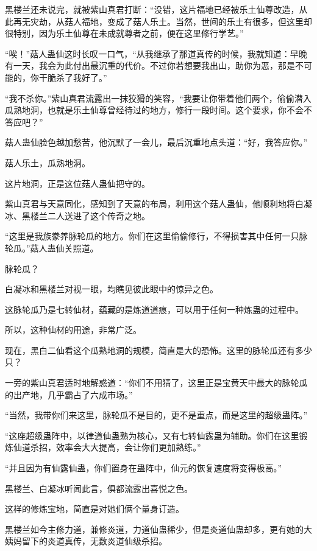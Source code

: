 
\begin{this_body}

黑楼兰还未说完，就被紫山真君打断：“没错，这片福地已经被乐土仙尊改造，从此再无灾劫，从菇人福地，变成了菇人乐土。当然，世间的乐土有很多，但这里却很特别，因为乐土仙尊在未成就尊者之前，便在这里修行学艺。”

“唉！”菇人蛊仙这时长叹一口气，“从我继承了那道真传的时候，我就知道：早晚有一天，我会为此付出最沉重的代价。不过你若想要我出山，助你为恶，那是不可能的，你干脆杀了我好了。”

“我不杀你。”紫山真君流露出一抹狡猾的笑容，“我要让你带着他们两个，偷偷潜入瓜熟地洞，也就是乐土仙尊曾经待过的地方，修行一段时间。这个要求，你不会不答应吧？”

菇人蛊仙脸色越加愁苦，他沉默了一会儿，最后沉重地点头道：“好，我答应你。”

菇人乐土，瓜熟地洞。

这片地洞，正是这位菇人蛊仙把守的。

紫山真君与天意同化，感知到了天意的布局，利用这个菇人蛊仙，他顺利地将白凝冰、黑楼兰二人送进了这个传奇之地。

“这里是我族豢养脉轮瓜的地方。你们在这里偷偷修行，不得损害其中任何一只脉轮瓜。”菇人蛊仙关照道。

脉轮瓜？

白凝冰和黑楼兰对视一眼，均瞧见彼此眼中的惊异之色。

这脉轮瓜乃是七转仙材，蕴藏的是炼道道痕，可以用于任何一种炼蛊的过程中。

所以，这种仙材的用途，非常广泛。

现在，黑白二仙看这个瓜熟地洞的规模，简直是大的恐怖。这里的脉轮瓜还有多少只？

一旁的紫山真君适时地解惑道：“你们不用猜了，这里正是宝黄天中最大的脉轮瓜的出产地，几乎霸占了六成市场。”

“当然，我带你们来这里，脉轮瓜不是目的，更不是重点，而是这里的超级蛊阵。”

“这座超级蛊阵中，以律道仙蛊熟为核心，又有七转仙露蛊为辅助。你们在这里锻炼仙道杀招，效率会大大提高，会让你们更加熟练。”

“并且因为有仙露仙蛊，你们置身在蛊阵中，仙元的恢复速度将变得极高。”

黑楼兰、白凝冰听闻此言，俱都流露出喜悦之色。

这样的修炼宝地，简直是对她们俩个量身订造。

黑楼兰如今主修力道，兼修炎道，力道仙蛊稀少，但是炎道仙蛊却多，更有她的大姨妈留下的炎道真传，无数炎道仙级杀招。


\end{this_body}
